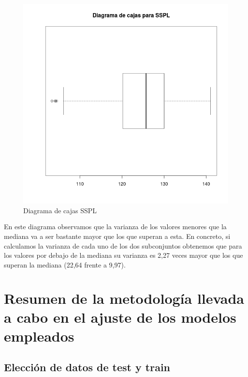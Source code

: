 \begin{figure}[H]
\centering
\includegraphics[scale=0.40]{boxplot_SSPL.png}
\caption{Diagrama de cajas SSPL}
\label{}
\end{figure}

En este diagrama observamos que la varianza de los valores menores que la mediana va a ser bastante mayor que los que superan a esta. En concreto, si calculamos la varianza de cada uno de los dos subconjuntos obtenemos que para los valores por debajo de la mediana su varianza es 2,27 veces mayor que los que superan la mediana (22,64 frente a 9,97).



\section{Resumen de la metodología llevada a cabo en el ajuste de los modelos empleados}


\subsection{Elección de datos de test y train}

